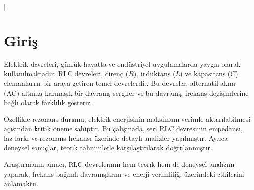 \documentclass[11pt,letterpaper,twocolumn]{article}
\begin{document}
]
\section{Giriş}
\justify
Elektrik devreleri, günlük hayatta ve endüstriyel uygulamalarda yaygın olarak kullanılmaktadır. RLC devreleri, direnç (\(R\)), indüktans (\(L\)) ve kapasitans (\(C\)) elemanlarını bir araya getiren temel devrelerdir. Bu devreler, alternatif akım (AC) altında karmaşık bir davranış sergiler ve bu davranış, frekans değişimlerine bağlı olarak farklılık gösterir. 

Özellikle rezonans durumu, elektrik enerjisinin maksimum verimle aktarılabilmesi açısından kritik öneme sahiptir. Bu çalışmada, seri RLC devresinin empedansı, faz farkı ve rezonans frekansı üzerinde detaylı analizler yapılmıştır. Ayrıca deneysel sonuçlar, teorik tahminlerle karşılaştırılarak doğrulanmıştır.

Araştırmanın amacı, RLC devrelerinin hem teorik hem de deneysel analizini yaparak, frekans bağımlı davranışlarını ve enerji verimliliği üzerindeki etkilerini anlamaktır.
\end{document}
